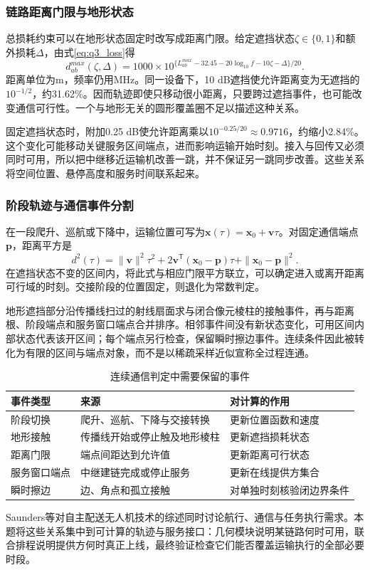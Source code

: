 \subsubsection{链路距离门限与地形状态}
总损耗约束可以在地形状态固定时改写成距离门限。给定遮挡状态$\zeta\in\{0,1\}$和额外损耗$\Delta$，由式\eqref{eq:q3_loss}得
\begin{equation}
 d_{ab}^{max}(\zeta,\Delta)=1000\times10^{\{L_{ab}^{max}-32.45-20\log_{10}f-10\zeta-\Delta\}/20}.
 \label{eq:q3_range_threshold}
\end{equation}
距离单位为m，频率仍用MHz。同一设备下，10 dB遮挡使允许距离变为无遮挡的$10^{-1/2}$，约31.62\%。因而轨迹即使只移动很小距离，只要跨过遮挡事件，也可能改变通信可行性。一个与地形无关的圆形覆盖圈不足以描述这种关系。

固定遮挡状态时，附加0.25 dB使允许距离乘以$10^{-0.25/20}\approx0.9716$，约缩小2.84\%。这个变化可能移动关键服务区间端点，进而影响运输开始时刻。接入与回传又必须同时可用，所以把中继移近运输机改善一跳，并不保证另一跳同步改善。这些关系将空间位置、悬停高度和服务时间联系起来。

\subsubsection{阶段轨迹与通信事件分割}
在一段爬升、巡航或下降中，运输位置可写为$\boldsymbol x(\tau)=\boldsymbol x_0+\boldsymbol v\tau$。对固定通信端点$\boldsymbol p$，距离平方是
\begin{equation}
 d^2(\tau)=\|\boldsymbol v\|^2\tau^2+2\boldsymbol v^{\mathsf T}(\boldsymbol x_0-\boldsymbol p)\tau+\|\boldsymbol x_0-\boldsymbol p\|^2.
 \label{eq:q3_distance_quadratic}
\end{equation}
在遮挡状态不变的区间内，将此式与相应门限平方联立，可以确定进入或离开距离可行域的时刻。交接阶段的位置固定，则退化为常数判定。

地形遮挡部分沿传播线扫过的射线扇面求与闭合像元棱柱的接触事件，再与距离根、阶段端点和服务窗口端点合并排序。相邻事件间没有新状态变化，可用区间内部状态代表该开区间；每个端点另行检查，保留瞬时擦边事件。连续条件因此被转化为有限的区间与端点对象，而不是以稀疏采样近似宣称全过程连通。

\begin{table}[htbp]\centering\small
\caption{连续通信判定中需要保留的事件}\label{tab:comm_events}
\begin{tabularx}{\linewidth}{p{2.8cm}LL}\toprule
事件类型 & 来源 & 对计算的作用\\\midrule
阶段切换 & 爬升、巡航、下降与交接转换 & 更新位置函数和速度\\
地形接触 & 传播线开始或停止触及地形棱柱 & 更新遮挡损耗状态\\
距离门限 & 端点间距达到允许值 & 更新距离可行状态\\
服务窗口端点 & 中继建链完成或停止服务 & 更新在线提供方集合\\
瞬时擦边 & 边、角点和孤立接触 & 对单独时刻核验闭边界条件\\\bottomrule
\end{tabularx}\end{table}

Saunders等对自主配送无人机技术的综述同时讨论航行、通信与任务执行需求\cite{saunders2024}。本题将这些关系集中到可计算的轨迹与服务接口：几何模块说明某链路何时可用，联合排程说明提供方何时真正上线，最终验证检查它们能否覆盖运输执行的全部必要时段。
